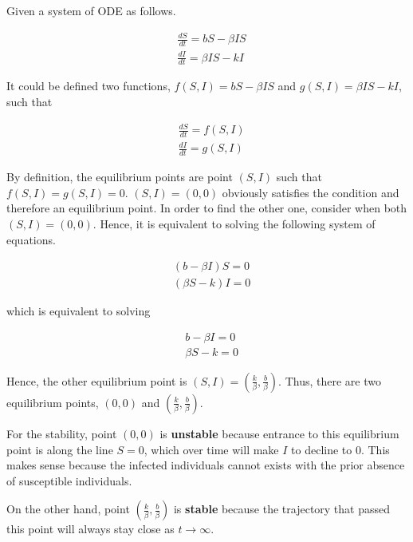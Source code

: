 \documentclass[../main.tex]{subfiles}
\begin{document}
    \begin{flushleft}
        Given a system of ODE as follows.
        
        \begin{align}
            & \frac{dS}{dt} = bS - \beta IS \\
            & \frac{dI}{dt} = \beta IS - kI
        \end{align}
        
        It could be defined two functions, $f(S, I) = bS - \beta IS$ and $g(S, I) = \beta IS - kI$, such that
        
        \begin{align}
            & \frac{dS}{dt} = f(S, I) \\
            & \frac{dI}{dt} = g(S, I)
        \end{align}
        
        By definition, the equilibrium points are point $(S, I)$ such that $f(S, I) = g(S, I) = 0$. $(S, I) = (0, 0)$ obviously satisfies the condition and therefore an equilibrium point. In order to find the other one, consider when both $(S, I) = (0, 0)$. Hence, it is equivalent to solving the following system of equations.
        
        \begin{align}
            & (b - \beta I)S = 0 \\
            & (\beta S - k)I = 0
        \end{align}
        
        which is equivalent to solving
        
        \begin{align*}
            & b - \beta I = 0 \\
            & \beta S - k = 0
        \end{align*}
        
        Hence, the other equilibrium point is $(S, I) = (\frac{k}{\beta}, \frac{b}{\beta})$. Thus, there are two equilibrium points, $(0, 0)$ and $(\frac{k}{\beta}, \frac{b}{\beta})$.
    \end{flushleft}
    
    \begin{flushleft}
        For the stability, point $(0, 0)$ is \textbf{unstable} because entrance to this equilibrium point is along the line $S = 0$, which over time will make $I$ to decline to 0. This makes sense because the infected individuals cannot exists with the prior absence of susceptible individuals.
        
        On the other hand, point $(\frac{k}{\beta}, \frac{b}{\beta})$ is \textbf{stable} because the trajectory that passed this point will always stay close as $t \to \infty$.

    \end{flushleft}
\end{document}
